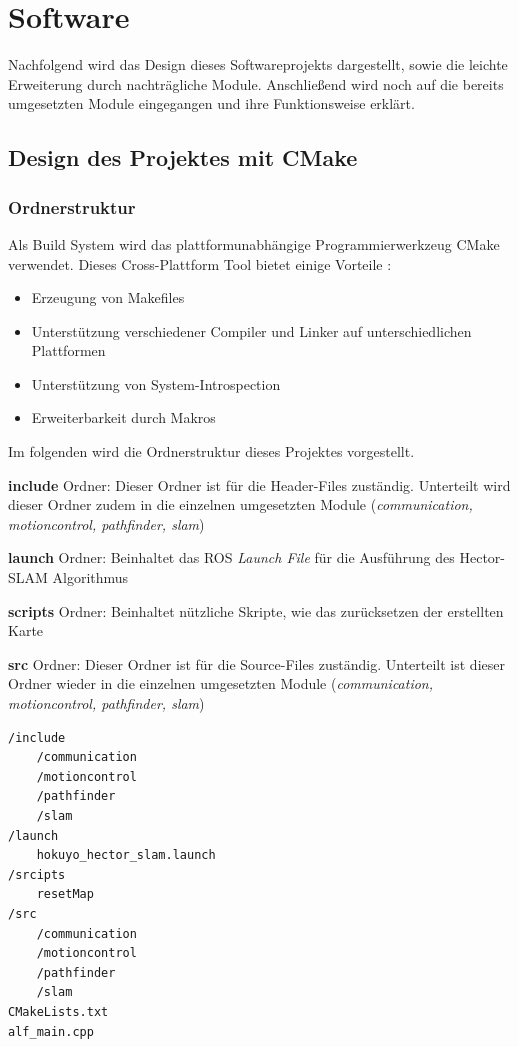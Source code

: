 \chapter{Software}
Nachfolgend wird das Design dieses Softwareprojekts dargestellt, sowie die leichte Erweiterung durch nachträgliche Module. Anschließend wird noch auf die bereits umgesetzten Module eingegangen und ihre Funktionsweise erklärt. 






\section{Design des Projektes mit CMake}


\subsection*{Ordnerstruktur}

Als Build System wird das plattformunabhängige Programmierwerkzeug CMake verwendet. Dieses Cross-Plattform Tool bietet einige Vorteile \cite{cmake.2018}:

\begin{itemize}
\item Erzeugung von Makefiles
\item Unterstützung verschiedener Compiler und Linker auf unterschiedlichen Plattformen
\item Unterstützung von System-Introspection
\item Erweiterbarkeit durch Makros
\end{itemize} 

Im folgenden wird die Ordnerstruktur dieses Projektes vorgestellt.

\textbf{include} Ordner: Dieser Ordner ist für die Header-Files zuständig. Unterteilt wird dieser Ordner zudem in die einzelnen umgesetzten Module (\textit{communication, motioncontrol, pathfinder, slam})

\textbf{launch} Ordner: Beinhaltet das ROS \textit{Launch File} für die Ausführung des Hector-SLAM Algorithmus

\textbf{scripts} Ordner: Beinhaltet nützliche Skripte, wie das zurücksetzen der erstellten Karte

\textbf{src} Ordner: Dieser Ordner ist für die Source-Files zuständig. Unterteilt ist dieser Ordner wieder in die einzelnen umgesetzten Module (\textit{communication, motioncontrol, pathfinder, slam})

\vspace{0.5cm}
\begin{lstlisting}
/include
	/communication
	/motioncontrol
	/pathfinder
	/slam
/launch
	hokuyo_hector_slam.launch
/srcipts
	resetMap
/src
	/communication
	/motioncontrol
	/pathfinder
	/slam
CMakeLists.txt
alf_main.cpp

\end{lstlisting}
\vspace{-0.5cm}

